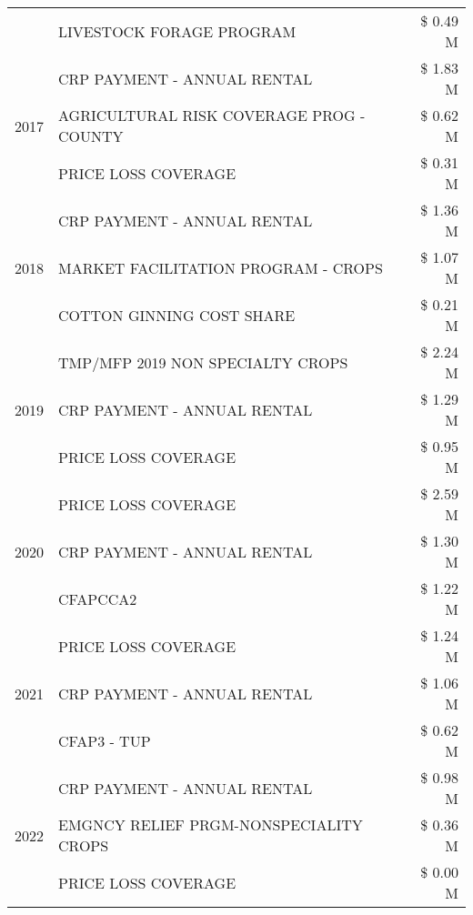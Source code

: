 \begin{tabular}{llr}
 & LIVESTOCK FORAGE PROGRAM & \$ 0.49 M \\
\cline{1-3}
\multirow[t]{3}{*}{2017} & CRP PAYMENT - ANNUAL RENTAL & \$ 1.83 M \\
 & AGRICULTURAL RISK COVERAGE PROG - COUNTY & \$ 0.62 M \\
 & PRICE LOSS COVERAGE & \$ 0.31 M \\
\cline{1-3}
\multirow[t]{3}{*}{2018} & CRP PAYMENT - ANNUAL RENTAL & \$ 1.36 M \\
 & MARKET FACILITATION PROGRAM - CROPS & \$ 1.07 M \\
 & COTTON GINNING COST SHARE & \$ 0.21 M \\
\cline{1-3}
\multirow[t]{3}{*}{2019} & TMP/MFP 2019 NON SPECIALTY CROPS & \$ 2.24 M \\
 & CRP PAYMENT - ANNUAL RENTAL & \$ 1.29 M \\
 & PRICE LOSS COVERAGE & \$ 0.95 M \\
\cline{1-3}
\multirow[t]{3}{*}{2020} & PRICE LOSS COVERAGE & \$ 2.59 M \\
 & CRP PAYMENT - ANNUAL RENTAL & \$ 1.30 M \\
 & CFAPCCA2 & \$ 1.22 M \\
\cline{1-3}
\multirow[t]{3}{*}{2021} & PRICE LOSS COVERAGE & \$ 1.24 M \\
 & CRP PAYMENT - ANNUAL RENTAL & \$ 1.06 M \\
 & CFAP3 - TUP & \$ 0.62 M \\
\cline{1-3}
\multirow[t]{3}{*}{2022} & CRP PAYMENT - ANNUAL RENTAL & \$ 0.98 M \\
 & EMGNCY RELIEF PRGM-NONSPECIALITY CROPS & \$ 0.36 M \\
 & PRICE LOSS COVERAGE & \$ 0.00 M \\
\cline{1-3}
\bottomrule
\end{tabular}
